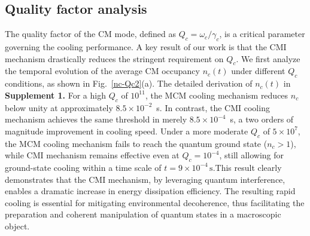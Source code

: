 \documentclass[aps, prresearch, reprint, nofootinbib, longbibliography]{revtex4-2}
\begin{document}
\subsection{Quality factor analysis}

The quality factor of the CM mode, defined as $Q_c = \omega_c / \gamma_c$, is a critical parameter governing the cooling performance.
A key result of our work is that the CMI mechanism drastically reduces the stringent requirement on $Q_c$.
We first analyze the temporal evolution of the average CM occupancy $n_c(t)$ under different $Q_c$ conditions, as shown in Fig.~\ref{nc-Qc2}(a).
The detailed derivation of \( n_c(t) \) in \textbf{Supplement 1.}
For a high $Q_c$ of $10^{11}$, the MCM cooling mechanism reduces $n_c$ below unity at approximately $8.5 \times 10^{-2}$~s. In contrast, the CMI cooling mechanism achieves the same threshold in merely $8.5 \times 10^{-4}$~s, a two orders of magnitude improvement in cooling speed. Under a more moderate $Q_c$ of $5 \times 10^{7}$, the MCM cooling mechanism fails to reach the quantum ground state ($n_c > 1$), while CMI mechanism remains effective even at $Q_c = 10^{-4}$, still allowing for ground-state cooling within a time scale of $t = 9 \times 10^{-4}\,\text{s}$.\hspace{0.5em}This result clearly demonstrates that the CMI mechanism, by leveraging quantum interference, enables a dramatic increase in energy dissipation efficiency. The resulting rapid cooling is essential for mitigating environmental decoherence, thus facilitating the preparation and coherent manipulation of quantum states in a macroscopic object.
\end{document}
